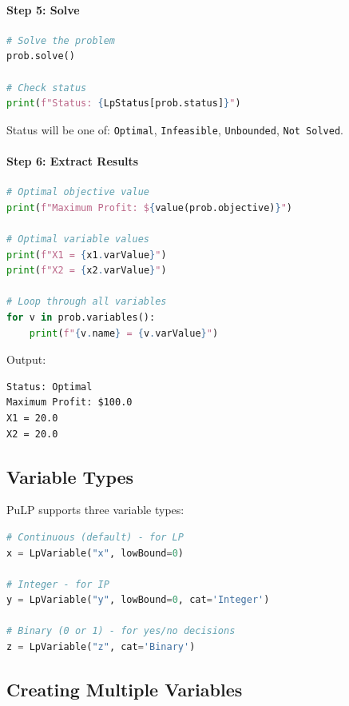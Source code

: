 \paragraph{Step 5: Solve}

\begin{lstlisting}[language=Python]
# Solve the problem
prob.solve()

# Check status
print(f"Status: {LpStatus[prob.status]}")
\end{lstlisting}

Status will be one of: \texttt{Optimal}, \texttt{Infeasible}, \texttt{Unbounded}, \texttt{Not Solved}.

\paragraph{Step 6: Extract Results}

\begin{lstlisting}[language=Python]
# Optimal objective value
print(f"Maximum Profit: ${value(prob.objective)}")

# Optimal variable values
print(f"X1 = {x1.varValue}")
print(f"X2 = {x2.varValue}")

# Loop through all variables
for v in prob.variables():
    print(f"{v.name} = {v.varValue}")
\end{lstlisting}

Output:
\begin{verbatim}
Status: Optimal
Maximum Profit: $100.0
X1 = 20.0
X2 = 20.0
\end{verbatim}

\subsection{Variable Types}

PuLP supports three variable types:

\begin{lstlisting}[language=Python]
# Continuous (default) - for LP
x = LpVariable("x", lowBound=0)

# Integer - for IP
y = LpVariable("y", lowBound=0, cat='Integer')

# Binary (0 or 1) - for yes/no decisions
z = LpVariable("z", cat='Binary')
\end{lstlisting}

\subsection{Creating Multiple Variables}

